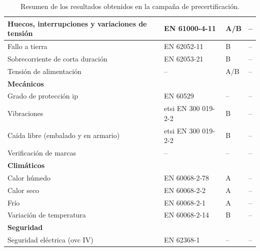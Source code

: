 \begin{table}[!h]
\begin{tabular}{|p{6.4cm}|p{3.4cm}|p{1.6cm}|p{2.4cm}|}
Huecos, interrupciones y variaciones de tensión & EN 61000-4-11 & A/B & -- \\ \hline
Fallo a tierra & EN 62052-11 & B & -- \\ \hline
Sobrecorriente de corta duración & EN 62053-21 & B & -- \\ \hline
Tensión de alimentación & -- & A/B & -- \\ \hline
\multicolumn{4}{|l|}{\textbf{Mecánicos}} \\ \hline
Grado de protección \gls{ip} & EN 60529 & -- & -- \\ \hline
Vibraciones & \gls{etsi} EN 300 019-2-2 & B & -- \\ \hline
Caída libre (embalado y en armario) & \gls{etsi} EN 300 019-2-2 & B & -- \\ \hline
Verificación de marcas & -- & -- & -- \\ \hline
\multicolumn{4}{|l|}{\textbf{Climáticos}} \\ \hline
Calor húmedo & EN 60068-2-78 & A & -- \\ \hline
Calor seco & EN 60068-2-2 & A & -- \\ \hline
Frío & EN 60068-2-1 & A & -- \\ \hline
Variación de temperatura & EN 60068-2-14 & B & -- \\ \hline
\multicolumn{4}{|l|}{\textbf{Seguridad}} \\ \hline
Seguridad eléctrica (\gls{ovc} IV) & EN 62368-1 & -- & -- \\ \hline
\end{tabular}
\caption{Resumen de los resultados obtenidos en la campaña de precertificación.}
\label{tab:resumen_resultados_precert}
\end{table}
